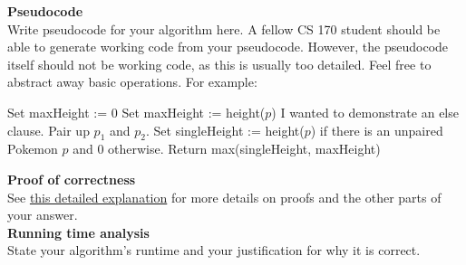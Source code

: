 \documentclass[12pt,a4paper]{article}
\begin{document}
\noindent
\textbf{Pseudocode}\\

Write pseudocode for your algorithm here. A fellow CS 170 student should be able to generate working code from your pseudocode. However, the pseudocode itself should not be working code, as this is usually too detailed. Feel free to abstract away basic operations. For example:\\

\begin{algorithmic}[0]
\State Set maxHeight := $0$
		\State Set maxHeight := height($p$)
	\Else
		\State I wanted to demonstrate an else clause.
	\EndIf
\EndFor
{}
	\State Pair up $p_1$ and $p_2$.
\EndWhile
\State Set singleHeight := height($p$) if there is an unpaired Pokemon $p$ and 0 otherwise.
\State Return max(singleHeight, maxHeight)
\EndProcedure
\end{algorithmic}

\vspace{0.2in}

\noindent
\textbf{Proof of correctness}\\

See \href{http://www-inst.eecs.berkeley.edu/~cs170/fa14/hws/instruct.pdf}{this detailed explanation} for more details on proofs and the other parts of your answer.\\

\noindent
\textbf{Running time analysis}\\

State your algorithm's runtime and your justification for why it is correct.
\end{document}

